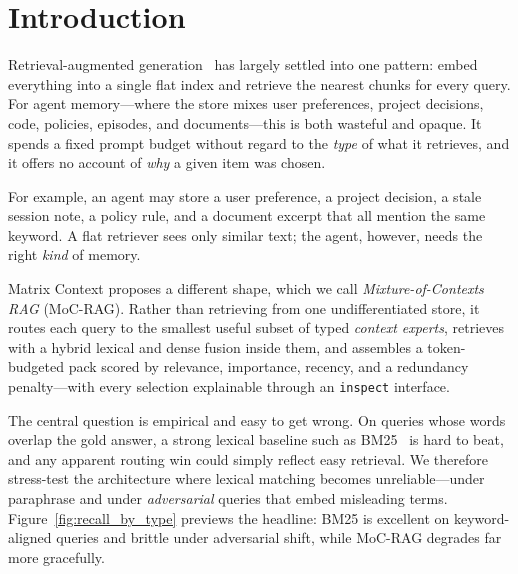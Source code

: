 \section{Introduction}

Retrieval-augmented generation~\cite{lewis2020rag} has largely settled into one
pattern: embed everything into a single flat index and retrieve the nearest
chunks for every query. For agent memory---where the store mixes user
preferences, project decisions, code, policies, episodes, and documents---this
is both wasteful and opaque. It spends a fixed prompt budget without regard to
the \emph{type} of what it retrieves, and it offers no account of \emph{why} a
given item was chosen.

For example, an agent may store a user preference, a project decision, a stale
session note, a policy rule, and a document excerpt that all mention the same
keyword. A flat retriever sees only similar text; the agent, however, needs the
right \emph{kind} of memory.

Matrix Context proposes a different shape, which we call
\emph{Mixture-of-Contexts RAG} (MoC-RAG). Rather than retrieving from one
undifferentiated store, it routes each query to the smallest useful subset of
typed \emph{context experts}, retrieves with a hybrid lexical and dense fusion
inside them, and assembles a token-budgeted pack scored by relevance,
importance, recency, and a redundancy penalty---with every selection explainable
through an \texttt{inspect} interface.

The central question is empirical and easy to get wrong. On queries whose words
overlap the gold answer, a strong lexical baseline such as BM25~\cite{robertson2009bm25}
is hard to beat, and any apparent routing win could simply reflect easy
retrieval. We therefore stress-test the architecture where lexical matching
becomes unreliable---under paraphrase and under \emph{adversarial} queries that
embed misleading terms. Figure~\ref{fig:recall_by_type} previews the headline:
BM25 is excellent on keyword-aligned queries and brittle under adversarial
shift, while MoC-RAG degrades far more gracefully.

